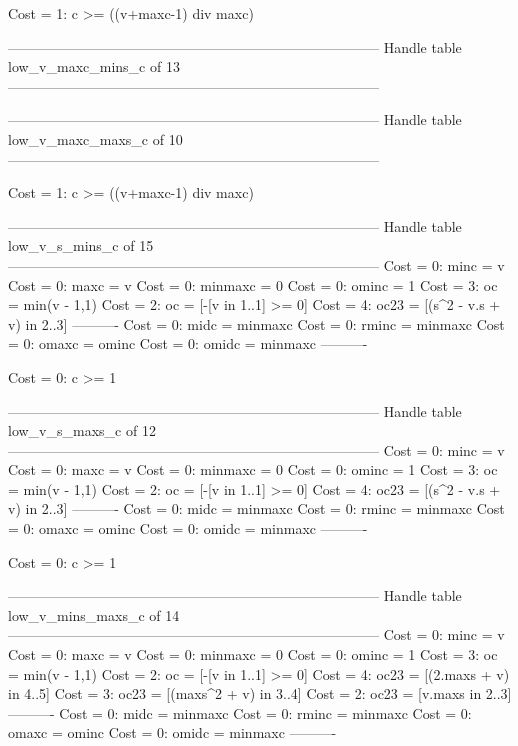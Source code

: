 Cost =  1:  c >= ((v+maxc-1) div maxc)

--------------------------------------------------------------------------------
Handle table low_v_maxc_mins_c of 13
--------------------------------------------------------------------------------


--------------------------------------------------------------------------------
Handle table low_v_maxc_maxs_c of 10
--------------------------------------------------------------------------------

Cost =  1:  c >= ((v+maxc-1) div maxc)

--------------------------------------------------------------------------------
Handle table low_v_s_mins_c of 15
--------------------------------------------------------------------------------
Cost =  0:  minc    = v
Cost =  0:  maxc    = v
Cost =  0:  minmaxc = 0
Cost =  0:  ominc   = 1
Cost =  3:  oc      = min(v - 1,1)
Cost =  2:  oc      = [-[v in 1..1] >= 0]
Cost =  4:  oc23    = [(s^2 - v.s + v) in 2..3]
----------
Cost =  0:  midc    = minmaxc
Cost =  0:  rminc   = minmaxc
Cost =  0:  omaxc   = ominc
Cost =  0:  omidc   = minmaxc
----------

Cost =  0:  c >= 1

--------------------------------------------------------------------------------
Handle table low_v_s_maxs_c of 12
--------------------------------------------------------------------------------
Cost =  0:  minc    = v
Cost =  0:  maxc    = v
Cost =  0:  minmaxc = 0
Cost =  0:  ominc   = 1
Cost =  3:  oc      = min(v - 1,1)
Cost =  2:  oc      = [-[v in 1..1] >= 0]
Cost =  4:  oc23    = [(s^2 - v.s + v) in 2..3]
----------
Cost =  0:  midc    = minmaxc
Cost =  0:  rminc   = minmaxc
Cost =  0:  omaxc   = ominc
Cost =  0:  omidc   = minmaxc
----------

Cost =  0:  c >= 1

--------------------------------------------------------------------------------
Handle table low_v_mins_maxs_c of 14
--------------------------------------------------------------------------------
Cost =  0:  minc    = v
Cost =  0:  maxc    = v
Cost =  0:  minmaxc = 0
Cost =  0:  ominc   = 1
Cost =  3:  oc      = min(v - 1,1)
Cost =  2:  oc      = [-[v in 1..1] >= 0]
Cost =  4:  oc23    = [(2.maxs + v) in 4..5]
Cost =  3:  oc23    = [(maxs^2 + v) in 3..4]
Cost =  2:  oc23    = [v.maxs in 2..3]
----------
Cost =  0:  midc    = minmaxc
Cost =  0:  rminc   = minmaxc
Cost =  0:  omaxc   = ominc
Cost =  0:  omidc   = minmaxc
----------

